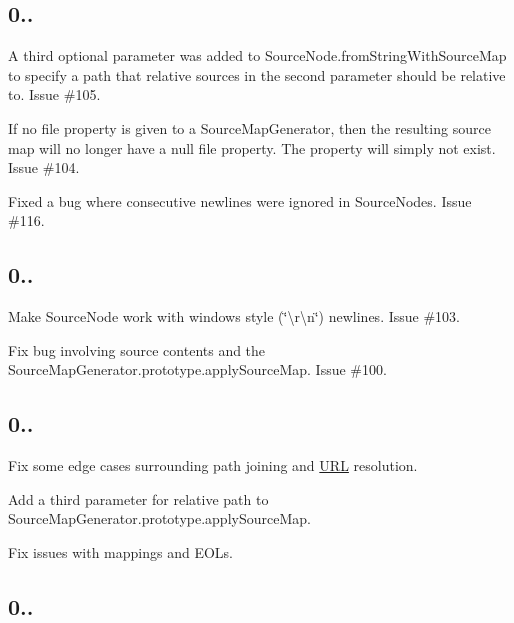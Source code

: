 \subsection*{0..}


\begin{DoxyItemize}
\item A third optional parameter was added to {\ttfamily Source\+Node.\+from\+String\+With\+Source\+Map} to specify a path that relative sources in the second parameter should be relative to. Issue \#105.
\item If no file property is given to a {\ttfamily Source\+Map\+Generator}, then the resulting source map will no longer have a {\ttfamily null} file property. The property will simply not exist. Issue \#104.
\item Fixed a bug where consecutive newlines were ignored in {\ttfamily Source\+Node}s. Issue \#116.
\end{DoxyItemize}

\subsection*{0..}


\begin{DoxyItemize}
\item Make {\ttfamily Source\+Node} work with windows style (\char`\"{}\textbackslash{}r\textbackslash{}n\char`\"{}) newlines. Issue \#103.
\item Fix bug involving source contents and the {\ttfamily Source\+Map\+Generator.\+prototype.\+apply\+Source\+Map}. Issue \#100.
\end{DoxyItemize}

\subsection*{0..}


\begin{DoxyItemize}
\item Fix some edge cases surrounding path joining and \mbox{\hyperlink{namespace_u_r_l}{U\+RL}} resolution.
\item Add a third parameter for relative path to {\ttfamily Source\+Map\+Generator.\+prototype.\+apply\+Source\+Map}.
\item Fix issues with mappings and E\+O\+Ls.
\end{DoxyItemize}

\subsection*{0..}


